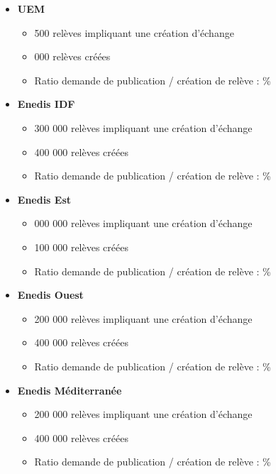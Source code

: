 \documentclass[a4paper, 12pt]{report}
\begin{document}
\begin{itemize}
  \item \textbf{UEM}
  \begin{itemize}
    \item \approx{} 500 relèves impliquant une création d'échange
    \item \approx{} 000 relèves créées
    \item Ratio demande de publication / création de relève : \approx{}\%
  \end{itemize}
  \item \textbf{Enedis IDF}
  \begin{itemize}
    \item \approx{} 300 000 relèves impliquant une création d'échange
    \item \approx{} 400 000 relèves créées
    \item Ratio demande de publication / création de relève : \approx{}\%
  \end{itemize}
  \item \textbf{Enedis Est}
  \begin{itemize}
    \item \approx{} 000 000 relèves impliquant une création d'échange
    \item \approx{} 100 000 relèves créées
    \item Ratio demande de publication / création de relève : \approx{}\%
  \end{itemize}
  \item \textbf{Enedis Ouest}
  \begin{itemize}
    \item \approx{} 200 000 relèves impliquant une création d'échange
    \item \approx{} 400 000 relèves créées
    \item Ratio demande de publication / création de relève : \approx{}\%
  \end{itemize}
  \item \textbf{Enedis Méditerranée}
  \begin{itemize}
    \item \approx{} 200 000 relèves impliquant une création d'échange
    \item \approx{} 400 000 relèves créées
    \item Ratio demande de publication / création de relève : \approx{}\%
  \end{itemize}
\end{itemize}
\clearpage
\end{document}
